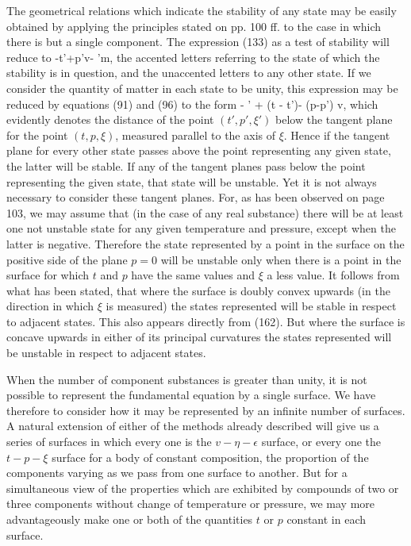 \documentclass[12pt]{article}
\begin{document}
The geometrical relations which indicate the stability of any state may be easily obtained by applying the principles stated on pp. 100 ff. to the case in which there is but a single component. The expression (133) as a test of stability will reduce to
\eqs \epsilon-t'\eta+p'v- \mu'm, \label{197}\eqe
the accented letters referring to the state of which the stability is in question, and the unaccented letters to any other state. If we consider the quantity of matter in each state to be unity, this expression may be reduced by equations (91) and (96) to the form
\eqs \xi- \xi' + (t - t')\eta - (p-p') v, \label{198}\eqe
which evidently denotes the distance of the point $(t', p', \xi')$ below the tangent plane for the point $(t, p, \xi)$, measured parallel to the axis of $\xi$. Hence if the tangent plane for every other state passes above the point representing any given state, the latter will be stable. If any of the tangent planes pass below the point representing the given state, that state will be unstable. Yet it is not always necessary to consider these tangent planes. For, as has been observed on page 103, we may assume that (in the case of any real substance) there will be at least one not unstable state for any given temperature and pressure, except when the latter is negative. Therefore the state represented by a point in the surface on the positive side of the plane $p =0$ will be unstable only when there is a point in the surface for which $t$ and $p$ have the same values and $\xi$ a less value. It follows from what has been stated, that where the surface is doubly convex upwards (in the direction in which $\xi$ is measured) the states represented will be stable in respect to adjacent states. This also appears directly from (162). But where the surface is concave upwards in either of its principal curvatures the states represented will be unstable in respect to adjacent states.


When the number of component substances is greater than unity, it is not possible to represent the fundamental equation by a single surface. We have therefore to consider how it may be represented by an infinite number of surfaces. A natural extension of either of the methods already described will give us a series of surfaces in which every one is the $v\!- \eta\!-\epsilon$ surface, or every one the $t\!-p\!-\xi$ surface for a body of constant composition, the proportion of the components varying as we pass from one surface to another. But for a simultaneous view of the properties which are exhibited by compounds of two or three components without change of temperature or pressure, we may more advantageously make one or both of the quantities $t$ or $p$ constant in each surface.
\end{document}
